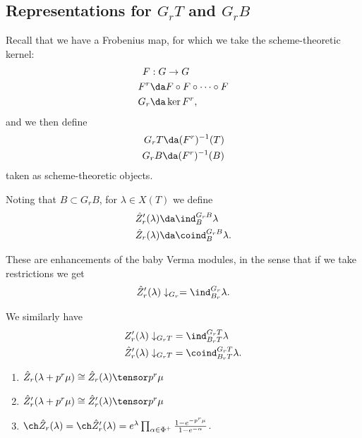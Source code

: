 \hypertarget{representations-for-g_r-t-and-g_r-b}{%
\subsection{\texorpdfstring{Representations for \(G_r T\) and
\(G_r B\)}{Representations for G\_r T and G\_r B}}\label{representations-for-g_r-t-and-g_r-b}}

Recall that we have a Frobenius map, for which we take the
scheme-theoretic kernel:
\begin{align*}  
F&: G \to G \\ 
F^r &\da F\circ F \circ \cdots \circ F \\
G_r &\da \ker F^r
,\end{align*} and we then define
\begin{align*}  
G_r T \da (F^r)^{-1} (T) \\
G_r B \da (F^r)^{-1} (B) 
\end{align*} taken as scheme-theoretic objects.

Noting that \(B\subset G_r B\), for \(\lambda \in X(T)\) we define
\begin{align*}  
\hat{Z}_r' (\lambda) &\da \ind_B^{G_r B} \lambda \\
\hat{Z}_r (\lambda) &\da \coind_B^{G_r B} \lambda
.\end{align*}

These are enhancements of the baby Verma modules, in the sense that if
we take restrictions we get
\begin{align*}  
\hat{Z}_r' (\lambda) \downarrow_{G_r} = \ind_{B_r}^{G_r} \lambda
.\end{align*}

We similarly have
\begin{align*}  
{Z}_r' (\lambda) \downarrow_{G_r T} &= \ind_{B_r T}^{G_r T} \lambda \\
\hat{Z}_r' (\lambda) \downarrow_{G_r T} &= \coind_{B_r T}^{G_r T} \lambda
.\end{align*}

\begin{proposition}[?]

\envlist

\begin{enumerate}
\def\labelenumi{\arabic{enumi}.}
\tightlist
\item
  \(\hat{Z}_r(\lambda + p^r \mu) \cong \hat{Z}_r(\lambda) \tensor p^r \mu\)
\item
  \(\hat{Z}_r' (\lambda + p^r \mu) \cong \hat{Z}_r' (\lambda) \tensor p^r \mu\)
\item
  \(\ch \hat{Z}_r(\lambda) = \ch \hat{Z}_r' (\lambda) = e^\lambda \prod_{\alpha\in\Phi^+} {1 - e^{-p^r\mu} \over 1 - e^{-\alpha}}\).
\end{enumerate}

\end{proposition}

